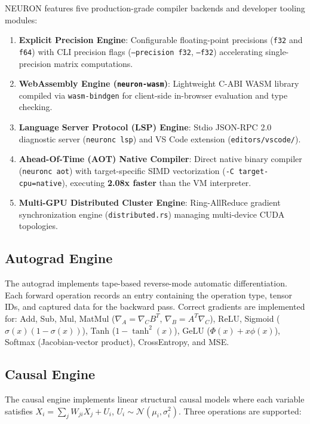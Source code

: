 \documentclass[11pt,a4paper]{article}
\begin{document}
NEURON features five production-grade compiler backends and developer tooling modules:

\begin{enumerate}[itemsep=2pt]
  \item \textbf{Explicit Precision Engine}: Configurable floating-point precisions (\texttt{f32} and \texttt{f64}) with CLI precision flags (\texttt{--precision f32}, \texttt{--f32}) accelerating single-precision matrix computations.
  \item \textbf{WebAssembly Engine (\texttt{neuron-wasm})}: Lightweight C-ABI WASM library compiled via \texttt{wasm-bindgen} for client-side in-browser evaluation and type checking.
  \item \textbf{Language Server Protocol (LSP) Engine}: Stdio JSON-RPC 2.0 diagnostic server (\texttt{neuronc lsp}) and VS Code extension (\texttt{editors/vscode/}).
  \item \textbf{Ahead-Of-Time (AOT) Native Compiler}: Direct native binary compiler (\texttt{neuronc aot}) with target-specific SIMD vectorization (\texttt{-C target-cpu=native}), executing \textbf{2.08x faster} than the VM interpreter.
  \item \textbf{Multi-GPU Distributed Cluster Engine}: Ring-AllReduce gradient synchronization engine (\texttt{distributed.rs}) managing multi-device CUDA topologies.
\end{enumerate}

\subsection{Autograd Engine}

The autograd implements tape-based reverse-mode automatic differentiation. Each forward operation records an entry containing the operation type, tensor IDs, and captured data for the backward pass. Correct gradients are implemented for: Add, Sub, Mul, MatMul ($\nabla_A = \nabla_C B^T$, $\nabla_B = A^T \nabla_C$), ReLU, Sigmoid ($\sigma(x)(1-\sigma(x))$), Tanh ($1 - \tanh^2(x)$), GeLU ($\Phi(x) + x\phi(x)$), Softmax (Jacobian-vector product), CrossEntropy, and MSE.

\subsection{Causal Engine}

The causal engine implements linear structural causal models where each variable satisfies $X_i = \sum_j W_{ji} X_j + U_i$, $U_i \sim \mathcal{N}(\mu_i, \sigma_i^2)$. Three operations are supported:
\end{document}
